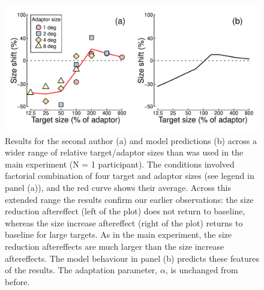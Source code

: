 \documentclass[
]{article}
\begin{document}
\begin{figure}
\centering
\includegraphics{Figures/FigureS2.pdf}
\caption{\label{fig:figureS2}Results for the second author (a) and model predictions (b) across a wider range of relative target/adaptor sizes than was used in the main experiment (N = 1 participant). The conditions involved factorial combination of four target and adaptor sizes (see legend in panel (a)), and the red curve shows their average. Across this extended range the results confirm our earlier observations: the size reduction aftereffect (left of the plot) does not return to baseline, whereas the size increase aftereffect (right of the plot) returns to baseline for large targets. As in the main experiment, the size reduction aftereffects are much larger than the size increase aftereffects. The model behaviour in panel (b) predicts these features of the results. The adaptation parameter, \(\alpha\), is unchanged from before.}
\end{figure}
\end{document}
